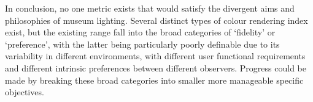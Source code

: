 In conclusion, no one metric exists that would satisfy the divergent aims and philosophies of museum lighting. Several distinct types of colour rendering index exist, but the existing range fall into the broad categories of `fidelity' or `preference', with the latter being particularly poorly definable due to its variability in different environments, with different user functional requirements and different intrinsic preferences between different observers. Progress could be made by breaking these broad categories into smaller more manageable specific objectives.

















